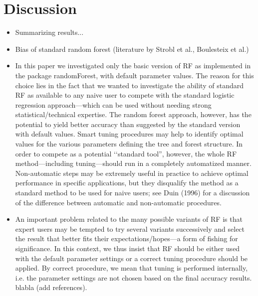 \documentclass[12pt]{article}
\begin{document}
\section{Discussion}
 \begin{itemize}
\item Summarizing results...
\item Bias of standard random forest (literature by Strobl et al., Boulesteix et al.)
\item In this paper we investigated only the basic version of RF as implemented in the package randomForest, with default parameter values. The reason for this choice lies in the fact that we wanted to investigate the ability of standard RF as available to any naive user to compete with the standard logistic regression approach---which can be used without needing strong statistical/technical expertise. The random forest approach, however, has the potential to yield better accuracy than suggested by the standard version with default values. Smart tuning procedures may help to identify optimal values for the various parameters defining the tree and forest structure. In order to compete as a potential \lq\lq standard tool'', however, the whole RF method---including tuning---should run in a completely automatized manner. Non-automatic steps may be extremely useful in practice to achieve optimal performance in specific applications, but they disqualify the method as a standard method to be used for naive users; see Duin (1996) for a discussion of the difference between automatic and non-automatic procedures.
\item An important problem related to the many possible variants of RF is that expert users may be tempted to try several variants successively and select the result that better fits their expectations/hopes---a form of fishing for significance. In this context, we thus insist that RF should be either used with the default parameter settings or a correct tuning procedure should be applied. By correct procedure, we mean that tuning is performed internally, i.e. the parameter settings are not chosen based  on the final accuracy results. blabla (add references).

\end{itemize}
\end{document}
